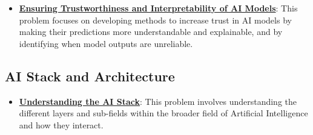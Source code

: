\documentclass{article}%
\begin{document}
\begin{itemize}[leftmargin=*]
\item \href{https://purdue.brightspace.com/d2l/common/assets/pdfjs-d2l-dist/1.0.14-legacy/web/viewer.html?file=\%2Fcontent\%2Fenforced\%2F1095467-wl.202510.CS.24300.001\%2F16L2-ethics.pdf\%3Fou\%3D1095467\&lang=en-us\&container=d2l-fileviewer-rendered-pdf\&fullscreen=d2l-fileviewer-rendered-pdf-dialog\&height=667#page=28}{\textbf{Ensuring Trustworthiness and Interpretability of AI Models}}: This problem focuses on developing methods to increase trust in AI models by making their predictions more understandable and explainable, and by identifying when model outputs are unreliable.%
\end{itemize}

%
\subsection{AI Stack and Architecture}%
\label{subsec:AIStackandArchitecture}%
\begin{itemize}[leftmargin=*]%
\item \href{https://purdue.brightspace.com/d2l/common/assets/pdfjs-d2l-dist/1.0.14-legacy/web/viewer.html?file=\%2Fcontent\%2Fenforced\%2F1095467-wl.202510.CS.24300.001\%2F02L2-Intro.pdf\%3Fou\%3D1095467\&lang=en-us\&container=d2l-fileviewer-rendered-pdf\&fullscreen=d2l-fileviewer-rendered-pdf-dialog\&height=667#page=44}{\textbf{Understanding the AI Stack}}: This problem involves understanding the different layers and sub-fields within the broader field of Artificial Intelligence and how they interact.%
\end{itemize}

%
\end{document}
